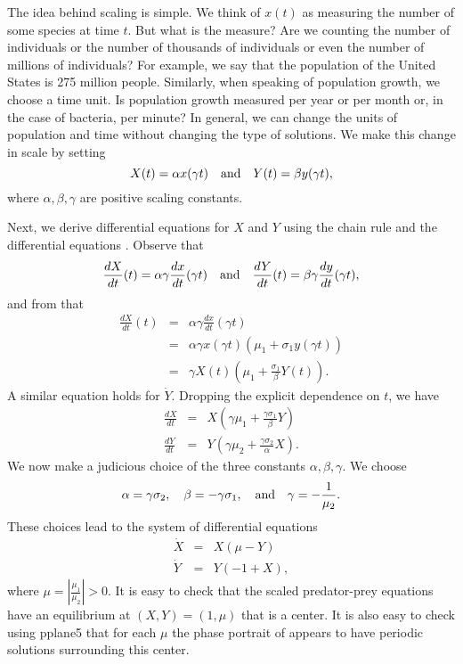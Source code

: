 \documentclass{ximera}
\begin{document}
The idea behind scaling is simple.  We think of $x(t)$ as measuring the 
number of some species at time $t$.  But what is the measure?  Are we 
counting the number of individuals or the number of thousands of
individuals or even the number of millions of individuals?  For example, 
we say that the population of the United States is 275 
million people.  Similarly, when speaking of population growth, 
we choose a time unit.  Is population growth measured per year 
or per month or, in the case of bacteria, per minute?  In general, we can 
change the units of population and time without changing the type of 
solutions.  We make this change in scale by setting  
\[
X(t) = \alpha x(\gamma t)  \quad\mbox{and}\quad  Y(t) = \beta y(\gamma t),
\]
where $\alpha,\beta,\gamma$ are positive scaling constants.  

Next, we derive differential equations for $X$ and $Y$ using the
chain rule and the differential 
equations . Observe that 
\[
\frac{dX}{dt}(t) = \alpha \gamma \frac{dx}{dt}(\gamma t) \quad\mbox{and}\quad  
\frac{dY}{dt}(t) = \beta \gamma \frac{dy}{dt}(\gamma t),
\]
and from  that 
\begin{eqnarray*}
\frac{dX}{dt}(t) & = & \alpha \gamma \frac{dx}{dt}(\gamma t) \\
& = & \alpha \gamma x(\gamma t)(\mu_1 + \sigma_1y(\gamma t)) \\
& = & \gamma X(t)(\mu_1 + \frac{\sigma_1}{\beta}Y(t)).
\end{eqnarray*}
A similar equation holds for $\dot{Y}$.  Dropping the explicit 
dependence on $t$, we have
\begin{eqnarray*}
\frac{dX}{dt} & = & X(\gamma \mu_1 + \frac{\gamma\sigma_1}{\beta}Y)\\
\frac{dY}{dt} & = & Y(\gamma \mu_2 + \frac{\gamma\sigma_2}{\alpha}X).
\end{eqnarray*}
We now make a judicious choice of the three constants $\alpha,\beta,
\gamma$.  We choose
\begin{equation}  \label{E:scalingcoeff}
\alpha = \gamma\sigma_2, \quad \beta = -\gamma\sigma_1, \AND
\gamma = -\frac{1}{\mu_2}.
\end{equation}
These choices lead to the system of differential equations
\begin{equation*}  \label{e:PP2}
\begin{array}{lcl}
\dot{X} & = & X(\mu - Y) \\
\dot{Y} & = & Y(-1 + X),
\end{array}
\end{equation*}%
where $\mu = \left|\frac{\mu_1}{\mu_2}\right|>0$.  It is easy to 
check that the scaled predator-prey equations  have 
an equilibrium at $(X,Y)=(1,\mu)$ that is a center.  It is also 
easy to check using {\sf pplane5} that for each $\mu$ the phase 
portrait of  appears to have periodic solutions 
surrounding this center.
\end{document}
